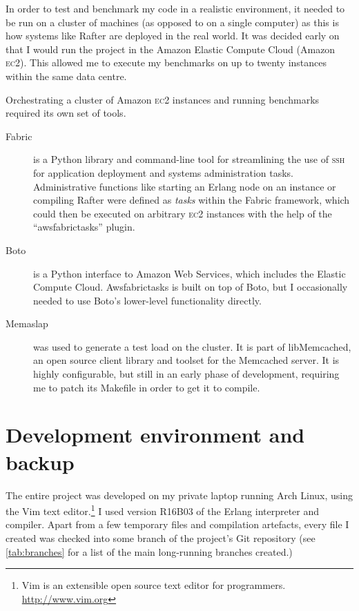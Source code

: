\documentclass[12pt,chapterprefix=true,toc=bibliography,numbers=noendperiod,
               footnotes=multiple,twoside]{scrreprt}
\newcommand{\ECC}[0]{\textsc{ec}2}
\begin{document}
In order to test and benchmark my code in a realistic environment, it needed to be run on a cluster of machines (as opposed to on a single computer) as this is how systems like Rafter are deployed in the real world. It was decided early on that I would run the project in the Amazon Elastic Compute Cloud (Amazon \textsc{ec2}). This allowed me to execute my benchmarks on up to twenty instances within the same data centre.

Orchestrating a cluster of Amazon \ECC{} instances and running benchmarks required its own set of tools.

\begin{description}
    \item[Fabric] is a Python library and command-line tool for streamlining the use of \textsc{ssh} for application deployment and systems administration tasks. Administrative functions like starting an Erlang node on an instance or compiling Rafter were defined as \emph{tasks} within the Fabric framework, which could then be executed on arbitrary \ECC{} instances with the help of the \enquote{awsfabrictasks} plugin.
    \item[Boto] is a Python interface to Amazon Web Services, which includes the Elastic Compute Cloud. Awsfabrictasks is built on top of Boto, but I occasionally needed to use Boto's lower-level functionality directly.
    \item[Memaslap] was used to generate a test load on the cluster. It is part of libMemcached, an open source client library and toolset for the Memcached server. It is highly configurable, but still in an early phase of development, requiring me to patch its Makefile in order to get it to compile.
\end{description}

\section{Development environment and backup}

The entire project was developed on my private laptop running Arch Linux, using the Vim text editor.\footnote{Vim is an extensible open source text editor for programmers. \url{http://www.vim.org}} I used version R16B03 of the Erlang interpreter and compiler. Apart from a few temporary files and compilation artefacts, every file I created was checked into some branch of the project's Git repository (see \cref{tab:branches} for a list of the main long-running branches created.)
\end{document}
